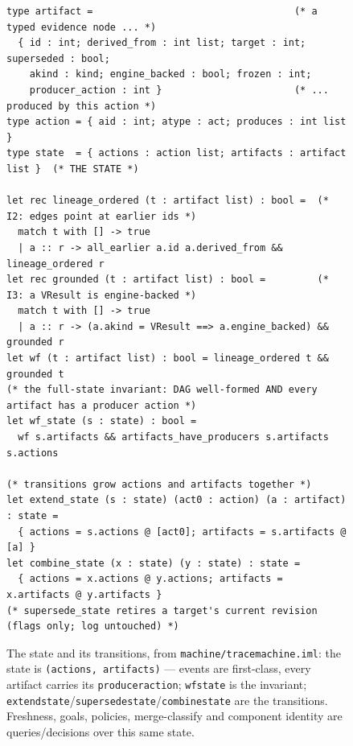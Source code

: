 \documentclass[11pt]{article}
\newcommand{\codeus}{\textunderscore\penalty100\relax}
\newcommand{\code}[1]{\texttt{\let\_\codeus #1}}
\begin{document}
\begin{figure}[H]
\begin{lstlisting}[language=IML]
type artifact =                                   (* a typed evidence node ... *)
  { id : int; derived_from : int list; target : int; superseded : bool;
    akind : kind; engine_backed : bool; frozen : int;
    producer_action : int }                       (* ... produced by this action *)
type action = { aid : int; atype : act; produces : int list }
type state  = { actions : action list; artifacts : artifact list }  (* THE STATE *)

let rec lineage_ordered (t : artifact list) : bool =  (* I2: edges point at earlier ids *)
  match t with [] -> true
  | a :: r -> all_earlier a.id a.derived_from && lineage_ordered r
let rec grounded (t : artifact list) : bool =         (* I3: a VResult is engine-backed *)
  match t with [] -> true
  | a :: r -> (a.akind = VResult ==> a.engine_backed) && grounded r
let wf (t : artifact list) : bool = lineage_ordered t && grounded t
(* the full-state invariant: DAG well-formed AND every artifact has a producer action *)
let wf_state (s : state) : bool =
  wf s.artifacts && artifacts_have_producers s.artifacts s.actions

(* transitions grow actions and artifacts together *)
let extend_state (s : state) (act0 : action) (a : artifact) : state =
  { actions = s.actions @ [act0]; artifacts = s.artifacts @ [a] }
let combine_state (x : state) (y : state) : state =
  { actions = x.actions @ y.actions; artifacts = x.artifacts @ y.artifacts }
(* supersede_state retires a target's current revision (flags only; log untouched) *)
\end{lstlisting}
\caption{The state and its transitions, from \code{machine/trace\_machine.iml}: the state is
\code{(actions, artifacts)} --- events are first-class, every artifact carries its \code{producer\_action};
\code{wf\_state} is the invariant; \code{extend\_state}/\code{supersede\_state}/\code{combine\_state} are the
transitions. Freshness, goals, policies, merge-classify and component identity are queries/decisions
over this same state.}
\label{fig:machine-state}
\end{figure}
\end{document}
